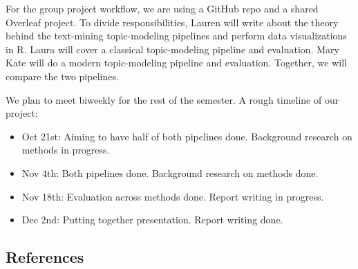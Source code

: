 \documentclass{article}
\begin{document}
For the group project workflow, we are using a GitHub repo and a shared Overleaf project. To divide responsibilities, Lauren will write about the theory behind the text-mining topic-modeling pipelines and perform data visualizations in R. Laura will cover a classical topic-modeling pipeline and evaluation. Mary Kate will do a modern topic-modeling pipeline and evaluation. Together, we will compare the two pipelines. 

We plan to meet biweekly for the rest of the semester. A rough timeline of our project:
\begin{itemize}
    
\item Oct 21st: Aiming to have half of both pipelines done. Background research on methods in progress.

\item  Nov 4th: Both pipelines done. Background research on methods done.

\item Nov 18th: Evaluation across methods done. Report writing in progress.

\item Dec 2nd: Putting together presentation. Report writing done.

\end{itemize}

\newpage
\subsection*{References}
\printbibliography[heading=none]
\end{document}
